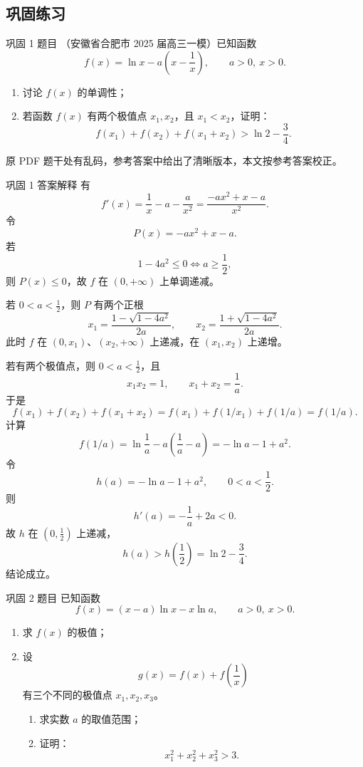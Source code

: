 ﻿\documentclass[aspectratio=169,10pt]{ctexbeamer}
\newcommand{\ocrnote}[1]{\par\medskip{\color{Warn}\bfseries 原文校验说明：}#1}
\begin{document}
\subsection{巩固练习}

\begin{frame}{巩固 1 题目}
\small
（安徽省合肥市 2025 届高三一模）已知函数
\[
f(x)=\ln x-a\left(x-\frac1x\right),\qquad a>0,\ x>0.
\]
\begin{enumerate}
  \item 讨论 $f(x)$ 的单调性；
  \item 若函数 $f(x)$ 有两个极值点 $x_1,x_2$，且 $x_1<x_2$，证明：
  \[
  f(x_1)+f(x_2)+f(x_1+x_2)>\ln2-\frac34.
  \]
\end{enumerate}
\ocrnote{原 PDF 题干处有乱码，参考答案中给出了清晰版本，本文按参考答案校正。}
\end{frame}

\begin{frame}[allowframebreaks]{巩固 1 答案解释}
\small
有
\[
f'(x)=\frac1x-a-\frac a{x^2}
=\frac{-ax^2+x-a}{x^2}.
\]
令
\[
P(x)=-ax^2+x-a.
\]
若
\[
1-4a^2\le0\Longleftrightarrow a\ge\frac12,
\]
则 $P(x)\le0$，故 $f$ 在 $(0,+\infty)$ 上单调递减。

若 $0<a<\frac12$，则 $P$ 有两个正根
\[
x_1=\frac{1-\sqrt{1-4a^2}}{2a},\qquad
x_2=\frac{1+\sqrt{1-4a^2}}{2a}.
\]
此时 $f$ 在 $(0,x_1)$、$(x_2,+\infty)$ 上递减，在 $(x_1,x_2)$ 上递增。

\framebreak

若有两个极值点，则 $0<a<\frac12$，且
\[
x_1x_2=1,\qquad x_1+x_2=\frac1a.
\]
于是
\[
f(x_1)+f(x_2)+f(x_1+x_2)
=f(x_1)+f(1/x_1)+f(1/a)
=f(1/a).
\]
计算
\[
f(1/a)=\ln\frac1a-a\left(\frac1a-a\right)
 =-\ln a-1+a^2.
\]
令
\[
h(a)=-\ln a-1+a^2,\qquad 0<a<\frac12.
\]
则
\[
h'(a)=-\frac1a+2a<0.
\]
故 $h$ 在 $(0,\frac12)$ 上递减，
\[
h(a)>h\left(\frac12\right)=\ln2-\frac34.
\]
结论成立。
\end{frame}

\begin{frame}{巩固 2 题目}
\small
已知函数
\[
f(x)=(x-a)\ln x-x\ln a,\qquad a>0,\ x>0.
\]
\begin{enumerate}
  \item 求 $f(x)$ 的极值；
  \item 设
  \[
  g(x)=f(x)+f\left(\frac1x\right)
  \]
  有三个不同的极值点 $x_1,x_2,x_3$。
  \begin{enumerate}
    \item 求实数 $a$ 的取值范围；
    \item 证明：
    \[
    x_1^2+x_2^2+x_3^2>3.
    \]
  \end{enumerate}
\end{enumerate}
\end{frame}
\end{document}
